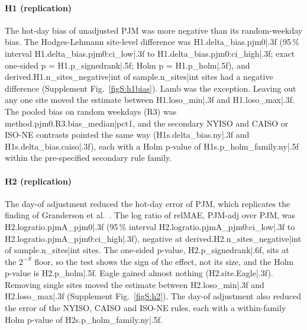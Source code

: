 \paragraph{H1 (replication)}The hot-day bias of unadjusted PJM was more negative than its random-weekday bias. The Hodges-Lehmann site-level difference was {{H1.delta_bias.pjm0|.3f}} (95\,\% interval {{H1.delta_bias.pjm0:ci_low|.3f}} to {{H1.delta_bias.pjm0:ci_high|.3f}}; exact one-sided p = {{H1.p_signedrank|.5f}}; Holm p = {{H1.p_holm|.5f}}), and {{derived.H1.n_sites_negative|int}} of {{sample.n_sites|int}} sites had a negative difference (Supplement Fig.~\ref{figS:h1bias}). Lamb was the exception. Leaving out any one site moved the estimate between {{H1.loso_min|.3f}} and {{H1.loso_max|.3f}}. The pooled bias on random weekdays (R3) was {{method.pjm0.R3.bias_median|pct1}}, and the secondary NYISO and CAISO or ISO-NE contrasts pointed the same way ({{H1s.delta_bias.ny|.3f}} and {{H1s.delta_bias.caiso|.3f}}), each with a Holm p-value of {{H1s.p_holm_family.ny|.5f}} within the pre-specified secondary rule family.

\paragraph{H2 (replication)}The day-of adjustment reduced the hot-day error of PJM, which replicates the finding of Granderson et al.\ \cite{granderson2021}. The log ratio of relMAE, PJM-adj over PJM, was {{H2.logratio.pjmA_pjm0|.3f}} (95\,\% interval {{H2.logratio.pjmA_pjm0:ci_low|.3f}} to {{H2.logratio.pjmA_pjm0:ci_high|.3f}}), negative at {{derived.H2.n_sites_negative|int}} of {{sample.n_sites|int}} sites. The one-sided p-value, {{H2.p_signedrank|.6f}}, sits at the $2^{-S}$ floor, so the test shows the sign of the effect, not its size, and the Holm p-value is {{H2.p_holm|.5f}}. Eagle gained almost nothing ({{H2.site.Eagle|.3f}}). Removing single sites moved the estimate between {{H2.loso_min|.3f}} and {{H2.loso_max|.3f}} (Supplement Fig.~\ref{figS:h2}). The day-of adjustment also reduced the error of the NYISO, CAISO and ISO-NE rules, each with a within-family Holm p-value of {{H2s.p_holm_family.ny|.5f}}.

